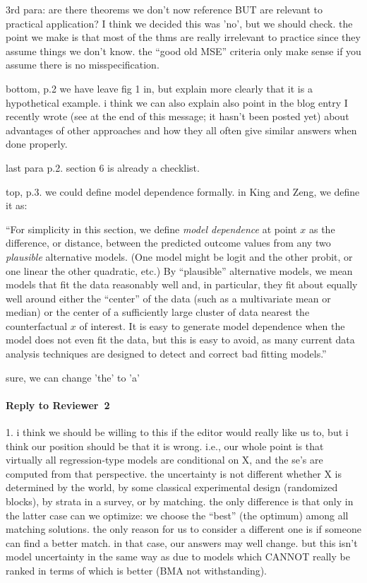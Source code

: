 \documentclass[11pt]{article}
\begin{document}
3rd para: are there theorems we don't now reference BUT are relevant
to practical application?  I think we decided this was 'no', but we
should check.  the point we make is that most of the thms are really
irrelevant to practice since they assume things we don't know.  the
``good old MSE'' criteria only make sense if you assume there is no
misspecification. 

bottom, p.2 we have leave fig 1 in, but explain more clearly that it
is a hypothetical example.  i think we can also explain also point in
the blog entry I recently wrote (see at the end of this message; it
hasn't been posted yet) about advantages of other approaches and how
they all often give similar answers when done properly.

last para p.2.  section 6 is already a checklist.

top, p.3. we could define model dependence formally.  in King and
Zeng, we define it as:

``For simplicity in this section, we define \emph{model dependence} at
point $x$ as the difference, or distance, between the predicted
outcome values from any two \emph{plausible} alternative models.  (One
model might be logit and the other probit, or one linear the other
quadratic, etc.)  By ``plausible'' alternative models, we mean models
that fit the data reasonably well and, in particular, they fit about
equally well around either the ``center'' of the data (such as a
multivariate mean or median) or the center of a sufficiently large
cluster of data nearest the counterfactual $x$ of interest. It is easy
to generate model dependence when the model does not even fit the
data, but this is easy to avoid, as many current data analysis
techniques are designed to detect and correct bad fitting models.''

sure, we can change 'the' to 'a'

\paragraph{Reply to Reviewer~2}

1. i think we should be willing to this if the editor would really
like us to, but i think our position should be that it is wrong.
i.e., our whole point is that virtually all regression-type models are
conditional on X, and the se's are computed from that perspective.
the uncertainty is not different whether X is determined by the world,
by some classical experimental design (randomized blocks), by strata
in a survey, or by matching.  the only difference is that only in the
latter case can we optimize: we choose the ``best'' (the optimum)
among all matching solutions.  the only reason for us to consider a
different one is if someone can find a better match.  in that case,
our answers may well change.  but this isn't model uncertainty in the
same way as due to models which CANNOT really be ranked in terms of
which is better (BMA not withstanding).
\end{document}
